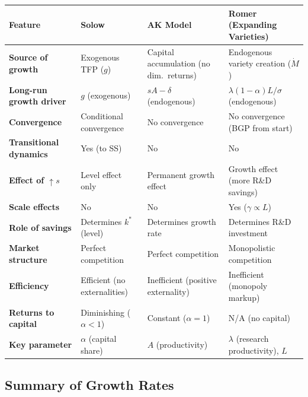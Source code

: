\documentclass[a4paper,11pt]{article}
\begin{document}
\begin{center}
\begin{tabular}{p{3.2cm}p{3.2cm}p{3.2cm}p{3.8cm}}
\toprule
\textbf{Feature} & \textbf{Solow} & \textbf{AK Model} & \textbf{Romer (Expanding Varieties)} \\
\midrule
\textbf{Source of growth} & Exogenous TFP ($g$) & Capital accumulation (no dim.\ returns) & Endogenous variety creation ($\dot{M}$) \\[6pt]
\textbf{Long-run growth driver} & $g$ (exogenous) & $sA - \delta$ (endogenous) & $\lambda(1-\alpha)L/\sigma$ (endogenous) \\[6pt]
\textbf{Convergence} & Conditional convergence & No convergence & No convergence (BGP from start) \\[6pt]
\textbf{Transitional dynamics} & Yes (to SS) & No & No \\[6pt]
\textbf{Effect of $\uparrow s$} & Level effect only & Permanent growth effect & Growth effect (more R\&D savings) \\[6pt]
\textbf{Scale effects} & No & No & Yes ($\gamma \propto L$) \\[6pt]
\textbf{Role of savings} & Determines $k^*$ (level) & Determines growth rate & Determines R\&D investment \\[6pt]
\textbf{Market structure} & Perfect competition & Perfect competition & Monopolistic competition \\[6pt]
\textbf{Efficiency} & Efficient (no externalities) & Inefficient (positive externality) & Inefficient (monopoly markup) \\[6pt]
\textbf{Returns to capital} & Diminishing ($\alpha < 1$) & Constant ($\alpha = 1$) & N/A (no capital) \\[6pt]
\textbf{Key parameter} & $\alpha$ (capital share) & $A$ (productivity) & $\lambda$ (research productivity), $L$ \\
\bottomrule
\end{tabular}
\end{center}

\bigskip

\subsection*{Summary of Growth Rates}
\end{document}
